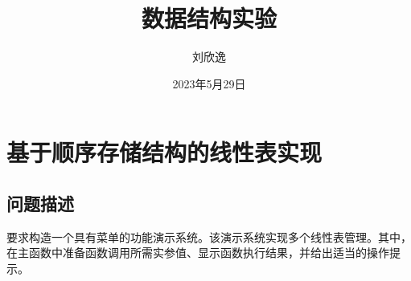 \documentclass[supercite]{Experimental_Report}
\title{~~~~~~数据结构实验~~~~~~}
\author{刘欣逸}
\date{2023年5月29日}
\theoremstyle{definition}
\begin{document}
\maketitle

\clearpage


\tableofcontents[level=2]

\clearpage


\section{基于顺序存储结构的线性表实现}


\subsection{问题描述}


要求构造一个具有菜单的功能演示系统。该演示系统实现多个线性表管理。其中，在主函数中准备函数调用所需实参值、显示函数执行结果，并给出适当的操作提示。
\end{document}
